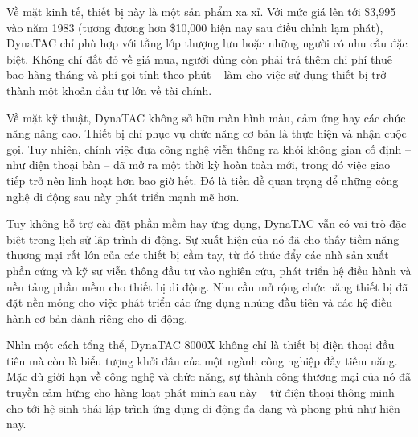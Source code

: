 \begin{flushleft}
  \hspace*{0.8cm}Về mặt kinh tế, thiết bị này là một sản phẩm xa xỉ. Với mức giá lên tới \$3,995 vào năm 1983 (tương đương hơn \$10,000 hiện nay sau điều chỉnh lạm phát), DynaTAC chỉ phù hợp với tầng lớp thượng lưu hoặc những người có nhu cầu đặc biệt. Không chỉ đắt đỏ về giá mua, người dùng còn phải trả thêm chi phí thuê bao hàng tháng và phí gọi tính theo phút – làm cho việc sử dụng thiết bị trở thành một khoản đầu tư lớn về tài chính.
\end{flushleft}

\begin{flushleft}
  \hspace*{0.8cm}Về mặt kỹ thuật, DynaTAC không sở hữu màn hình màu, cảm ứng hay các chức năng nâng cao. Thiết bị chỉ phục vụ chức năng cơ bản là thực hiện và nhận cuộc gọi. Tuy nhiên, chính việc đưa công nghệ viễn thông ra khỏi không gian cố định – như điện thoại bàn – đã mở ra một thời kỳ hoàn toàn mới, trong đó việc giao tiếp trở nên linh hoạt hơn bao giờ hết. Đó là tiền đề quan trọng để những công nghệ di động sau này phát triển mạnh mẽ hơn.
\end{flushleft}

\begin{flushleft}
  \hspace*{0.8cm}Tuy không hỗ trợ cài đặt phần mềm hay ứng dụng, DynaTAC vẫn có vai trò đặc biệt trong lịch sử lập trình di động. Sự xuất hiện của nó đã cho thấy tiềm năng thương mại rất lớn của các thiết bị cầm tay, từ đó thúc đẩy các nhà sản xuất phần cứng và kỹ sư viễn thông đầu tư vào nghiên cứu, phát triển hệ điều hành và nền tảng phần mềm cho thiết bị di động. Nhu cầu mở rộng chức năng thiết bị đã đặt nền móng cho việc phát triển các ứng dụng nhúng đầu tiên và các hệ điều hành cơ bản dành riêng cho di động.
\end{flushleft}

\begin{flushleft}
  \hspace*{0.8cm}Nhìn một cách tổng thể, DynaTAC 8000X không chỉ là thiết bị điện thoại đầu tiên mà còn là biểu tượng khởi đầu của một ngành công nghiệp đầy tiềm năng. Mặc dù giới hạn về công nghệ và chức năng, sự thành công thương mại của nó đã truyền cảm hứng cho hàng loạt phát minh sau này – từ điện thoại thông minh cho tới hệ sinh thái lập trình ứng dụng di động đa dạng và phong phú như hiện nay.
\end{flushleft}

